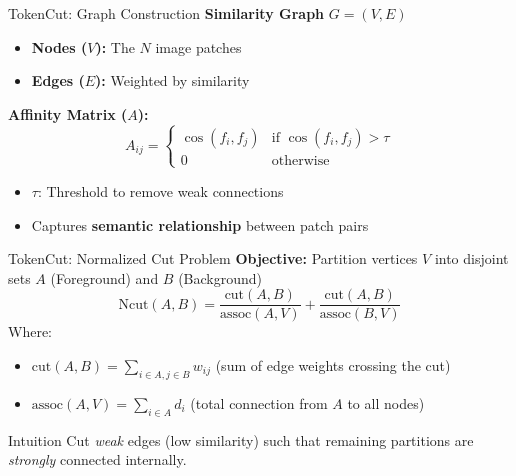 \documentclass[aspectratio=169]{beamer}
\begin{document}
\begin{frame}{TokenCut: Graph Construction}
\textbf{Similarity Graph} $G = (V, E)$
\begin{itemize}
    \item \textbf{Nodes ($V$):} The $N$ image patches
    \item \textbf{Edges ($E$):} Weighted by similarity
\end{itemize}
\vspace{0.5cm}
\textbf{Affinity Matrix ($A$):}
\begin{equation}
A_{ij} = \begin{cases} 
\cos(f_i, f_j) & \text{if } \cos(f_i, f_j) > \tau \\
0 & \text{otherwise}
\end{cases}
\end{equation}
\begin{itemize}
    \item $\tau$: Threshold to remove weak connections
    \item Captures \textbf{semantic relationship} between patch pairs
\end{itemize}
\end{frame}
\begin{frame}{TokenCut: Normalized Cut Problem}
\textbf{Objective:} Partition vertices $V$ into disjoint sets $A$ (Foreground) and $B$ (Background)
\begin{equation}
\text{Ncut}(A, B) = \frac{\text{cut}(A, B)}{\text{assoc}(A, V)} + \frac{\text{cut}(A, B)}{\text{assoc}(B, V)}
\end{equation}
Where:
\begin{itemize}
    \item $\text{cut}(A, B) = \sum_{i \in A, j \in B} w_{ij}$ (sum of edge weights crossing the cut)
    \item $\text{assoc}(A, V) = \sum_{i \in A} d_i$ (total connection from $A$ to all nodes)
\end{itemize}
\vspace{0.3cm}
\begin{block}{Intuition}
Cut \textit{weak} edges (low similarity) such that remaining partitions are \textit{strongly} connected internally.
\end{block}
\end{frame}
\end{document}
